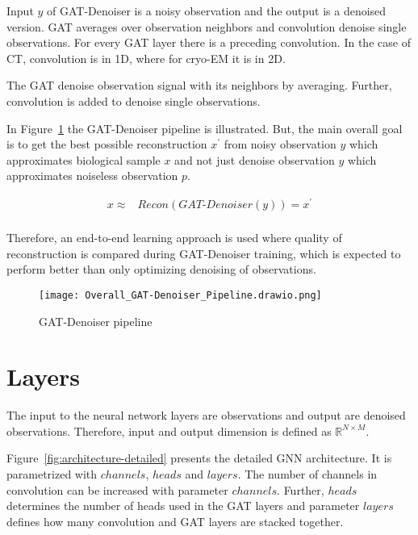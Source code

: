 
Input $y$ of GAT-Denoiser is a noisy observation and the output is a denoised version.
GAT averages over observation neighbors and convolution denoise single observations. 
For every GAT layer there is a preceding convolution. 
In the case of CT, convolution is in 1D, where for cryo-EM it is in 2D.

\begin{tcolorbox}[colback=red!5!white,colframe=red!75!black]
  The GAT denoise observation signal with its neighbors by averaging. 
  Further, convolution is added to denoise single observations.
\end{tcolorbox}

In Figure~\ref{fig:overall-concept} the GAT-Denoiser pipeline is illustrated.
But, the main overall goal is to get the best possible reconstruction $x^{\prime}$ 
from noisy observation $y$ which approximates biological sample $x$ and 
not just denoise observation $y$ which approximates noiseless observation $p$.


\begin{equation}
  \begin{aligned}
    x \approx   &\textit{Recon} \left( \textit{GAT-Denoiser} \left( y \right) \right) = x^{\prime} \\
  \end{aligned}
\end{equation}

Therefore, an end-to-end learning approach is used where quality of reconstruction is 
compared during GAT-Denoiser training, which is expected to perform better than 
only optimizing denoising of observations.

\begin{figure}[H]
  \centering
  \texttt{[image: Overall\_GAT-Denoiser\_Pipeline.drawio.png]}
  \caption{GAT-Denoiser pipeline}
  \label{fig:overall-concept}
\end{figure}


\section{Layers}
The input to the neural network layers are observations and output are denoised observations.
Therefore, input and output dimension is defined as  $\mathbb{R}^{N \times M}$. 

Figure~\ref{fig:architecture-detailed} presents the detailed GNN architecture.
It is parametrized with $channels$, $heads$ and $layers$. 
The number of channels in convolution can be increased with parameter $channels$.
Further, $heads$ determines the number of heads used in the GAT layers and parameter 
$layers$ defines how many convolution and GAT layers are stacked together.

